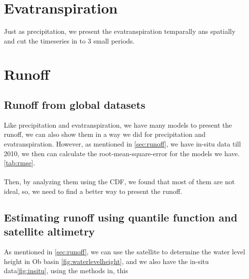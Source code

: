 \section{Evatranspiration}
Just as precipitation, we present the evatranspiration temparally ans spatially and cut the timeseries in to 3 small periods.

\section{Runoff}
\subsection{Runoff from global datasets}
Like precipitation and evatranspiration, we have many models to present the runoff, we can also show them in a way we did for precipitation and evatranspiration. However, as mentioned in \ref{sec:runoff}, we have in-situ data till 2010, we then can calculate the root-mean-square-error for the models we have. \ref{tab:rmse}.\\\\
Then, by analyzing them using the CDF, we found that most of them are not ideal, so, we need to find a better way to present the runoff.
\subsection{Estimating runoff using quantile function and satellite altimetry}
 As mentioned in \ref{sec:runoff}, we can use the satellite to determine the water level height in Ob basin \ref{fig:waterlevelheight}, and we also have the in-situ data\ref{fig:insitu}, using the methods in, this 